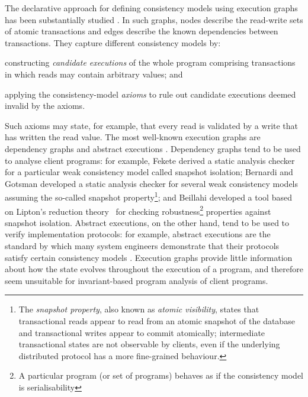 The declarative approach for defining 
consistency models using execution graphs has been substantially
studied \cite{adya,ev_transactions,framework-concur,SIanalysis,laws}. 
In such graphs, nodes describe the read-write sets of  atomic transactions and edges describe the
known dependencies between transactions.
They capture different consistency models by:
\begin{enumerate*}
	\item constructing  \emph{candidate executions} of the whole program comprising
transactions in which reads may contain arbitrary values; and 
	\item applying the consistency-model \emph{axioms} to rule out candidate executions deemed invalid by the axioms. 
\end{enumerate*}
Such axioms may state, for example, that every read is
validated by a write that has written the read value. 
The most well-known execution graphs are dependency graphs \cite{adya} and abstract
executions \cite{ev_transactions,framework-concur}. 
Dependency graphs tend to be used to analyse  client programs: for
example, 
Fekete \etal\citet{fekete-tods} derived 
a static analysis checker for a particular weak consistency model called
snapshot isolation;  Bernardi and Gotsman \citet{giovanni_concur16}
developed a static analysis checker for several weak consistency
models assuming the so-called snapshot property\footnote{The \emph{snapshot property}, 
also known as \emph{atomic visibility}, states that transactional reads appear to read from an atomic snapshot
of the database and transactional writes appear to commit atomically;  \ie intermediate transactional states are not observable by clients, 
even if the underlying distributed protocol has a more fine-grained behaviour.}; and 
Beillahi \etal\citep{snapshot-isolation-robust-tool} developed a tool based on Lipton's reduction theory~\cite{Lipton-reduction}
for checking robustness\footnote{A particular program (or set of programs) behaves as if the consistency model is serialisability} properties against snapshot isolation.
Abstract executions, on the other hand, tend to be used to verify  implementation protocols: for example,
abstract executions are the  standard by which many system engineers
demonstrate that their protocols satisfy  certain
consistency models \cite{cops,NMSI,PSI}. 
Execution graphs provide little information about how the 
state evolves throughout the execution of a program, and 
therefore seem  unsuitable for invariant-based program analysis 
of client programs. 


